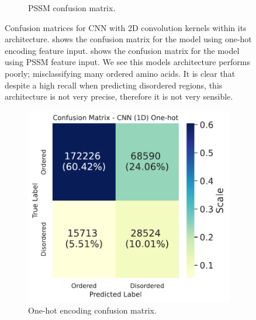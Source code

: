 \documentclass{l4proj}
\begin{document}
\begin{figure}[!htb]
\begin{subfigure}[b]{0.48\textwidth}
        \caption{PSSM confusion matrix.}
        \label{fig:cf2dpssm}
    \end{subfigure}
    \caption{Confusion matrices for CNN with 2D convolution kernels within its architecture.  shows the confusion matrix for the model using one-hot encoding feature input.  shows the confusion matrix for the model using PSSM feature input. We see this models architecture performs poorly; misclassifying many ordered amino acids. It is clear that despite a high recall when predicting disordered regions, this architecture is not very precise, therefore it is not very sensible.}
    \label{fig:cf2d}
\end{figure}

\begin{figure}[!htb] 
    \centering
    \begin{subfigure}[b]{0.48\textwidth}
        \includegraphics[width=\textwidth]{images/confmats/CNN1D1hot-cf.pdf}
        \caption{One-hot encoding confusion matrix.}
        \label{fig:cf1d1hot}
    \end{subfigure}
    ~
    \begin{subfigure}[b]{0.48\textwidth}

\end{subfigure}
\end{figure}
\end{document}

